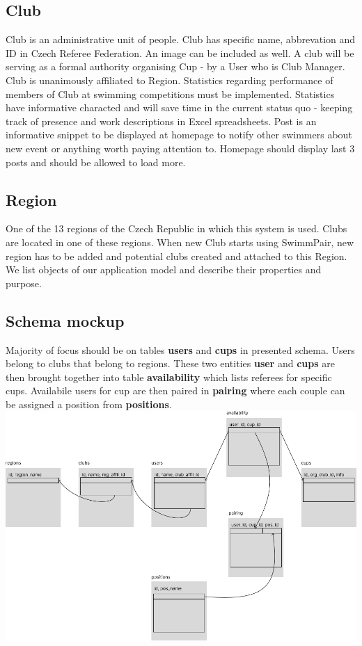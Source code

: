 \subsection*{Club}
\par
Club is an administrative unit of people. Club has specific name, abbrevation and ID in Czech Referee Federation. An image can be included as well. A club will be serving as a formal authority organising Cup - by a User who is Club Manager. Club is unanimously affiliated to Region. Statistics regarding performance of members of Club at swimming competitions must be implemented. Statistics have informative characted and will save time in the current status quo - keeping track of presence and work descriptions in Excel spreadsheets. 
Post is an informative snippet to be displayed at homepage to notify other swimmers about new event or anything worth paying attention to. Homepage should display last 3 posts and should be allowed to load more.
\subsection*{Region}
One of the 13 regions of the Czech Republic in which this system is used. Clubs are located in one of these regions. When new Club starts using SwimmPair, new region has to be added and potential clubs created and attached to this Region. 
We list objects of our application model and describe their properties and purpose.

\subsection*{Schema mockup}
Majority of focus should be on tables \textbf{users} and \textbf{cups} in presented schema. Users belong to clubs that belong to regions. These two entities \textbf{user} and \textbf{cups} are then brought together into table \textbf{availability} which lists referees for specific cups. Availabile users for cup are then paired in \textbf{pairing} where each couple can be assigned a position from \textbf{positions}.
\newline
\includegraphics[scale=0.430]{img/swimmpair_db_mockup.png}
